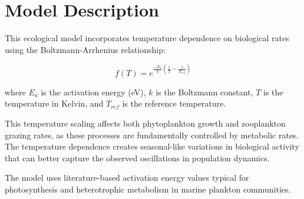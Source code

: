 \section{Model Description}

This ecological model incorporates temperature dependence on biological rates using the Boltzmann-Arrhenius relationship:

\[ f(T) = e^{\frac{-E_a}{k} (\frac{1}{T} - \frac{1}{T_{ref}})} \]

where $E_a$ is the activation energy (eV), $k$ is the Boltzmann constant, $T$ is the temperature in Kelvin, and $T_{ref}$ is the reference temperature.

This temperature scaling affects both phytoplankton growth and zooplankton grazing rates, as these processes are fundamentally controlled by metabolic rates. The temperature dependence creates seasonal-like variations in biological activity that can better capture the observed oscillations in population dynamics.

The model uses literature-based activation energy values typical for photosynthesis and heterotrophic metabolism in marine plankton communities.
